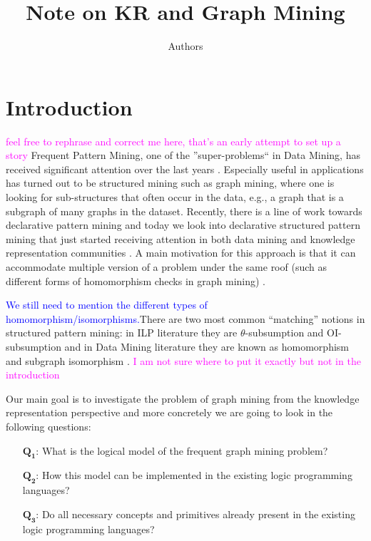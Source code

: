 \documentclass{article}
\author{Authors}
\title{Note on KR and Graph Mining}
\theoremstyle{definition}
\newcommand{\sergey}[1]{\textcolor{magenta}{\marginpar{\sc Sergey} #1}}
\newcommand{\matthias}[1]{\textcolor{blue}{\marginpar{\sc Matthias} #1}}
\newcommand{\Qone}{$\boldsymbol{Q_1}$\xspace}
\newcommand{\Qtwo}{$\boldsymbol{Q_2}$\xspace}
\newcommand{\Qthree}{$\boldsymbol{Q_3}$\xspace}
\begin{document}
\maketitle

\section{Introduction}
\sergey{feel free to rephrase and correct me here, that's an early attempt to set up a story}
Frequent Pattern Mining, one of the ''super-problems`` in Data Mining, has received significant attention over the last years \citep{pattern_mining_book}. Especially useful in applications has turned out to be structured mining such as graph mining, where one is looking for sub-structures that often occur in the data, e.g., a graph that is a subgraph of many graphs in the dataset. Recently, there is a line of work towards declarative pattern mining \citep{tias_declarative_pattern_mining} and today we look into declarative structured pattern mining that just started receiving attention in both data mining and knowledge representation communities \citep{cp_sequence_mining,ilp_graph_mining}. A main motivation for this approach is that it can accommodate multiple version of a problem under the same roof (such as different forms of homomorphism checks in graph mining) .


\matthias{We still need to mention the different types of homomorphism/isomorphisms.}There are two most common ``matching'' notions in structured pattern mining: in ILP literature they are $\theta$-subsumption and OI-subsumption and in Data Mining literature they are known as homomorphism and subgraph isomorphism \citep{jan_ramon}. \sergey{I am not sure where to put it exactly but not in the introduction}


Our main goal is to investigate the problem of graph mining from the knowledge representation perspective and more concretely we are going to look in the following questions:
\begin{itemize}
  \item[\Qone:]   What is the logical model of the frequent graph mining problem?
  \item[\Qtwo:]   How this model can be implemented in the existing logic programming languages?
  \item[\Qthree:] Do all necessary concepts and primitives already present in the existing logic programming languages?
\end{itemize}
\end{document}
